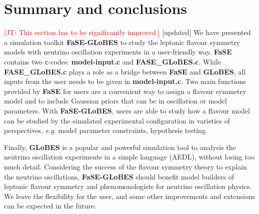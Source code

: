 \documentclass[aps,prd,nofootinbib,preprint]{revtex4}
\begin{document}
\section{Summary and conclusions}
\textcolor{red}{[JT: This section has to be significantly improved.]}
{\color{blue}[updated]}
We have presented a simulation toolkit \textbf{FaSE-GLoBES} to study the leptonic flavour symmetry models with neutrino oscillation experiments in a user-friendly way. \textbf{FaSE} contains two \texttt{c}-codes: \textbf{model-input.c} and \textbf{FASE\_GLoBES.c}. While \textbf{FASE\_GLoBES.c} plays a role as a bridge between \textbf{FaSE} and \textbf{GLoBES}, all inputs from the user needs to be given in \textbf{model-input.c}. Two main functions provided by \textbf{FaSE} for users are a convenient way to assign a flavour symmetry model and to include Gaussian priors that can be in oscillation or model parameters.
%
With \textbf{FaSE-GLoBES}, users are able to study how a flavour model can be studied by the simulated experimental configuration in varieties of perspectives, \textit{e.g.} model parameter constraints, hypothesis testing.

Finally, \textbf{GLoBES} is a popular and powerful simulation tool to analysis the neutrino oscillation experiments in a simple language (AEDL), without losing too much detail. Considering the success of the flavour symmetry theory to explain the neutrino oscillations, \textbf{FaSE-GLoBES} should benefit model builders of leptonic flavour symmetry and phenomenologists for neutrino oscillation physics. We leave the flexibility for the user, and some other improvements and extensions can be expected in the future.



%

\end{document}
